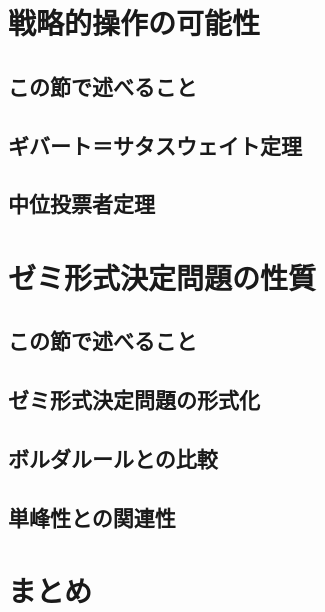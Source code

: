 \documentclass{jsarticle}
\begin{document}
\section{戦略的操作の可能性}
\subsection{この節で述べること}
\subsection{ギバート＝サタスウェイト定理}
\subsection{中位投票者定理}

\section{ゼミ形式決定問題の性質}
\subsection{この節で述べること}
\subsection{ゼミ形式決定問題の形式化}
\subsection{ボルダルールとの比較}
\subsection{単峰性との関連性}

\section{まとめ}
\end{document}
